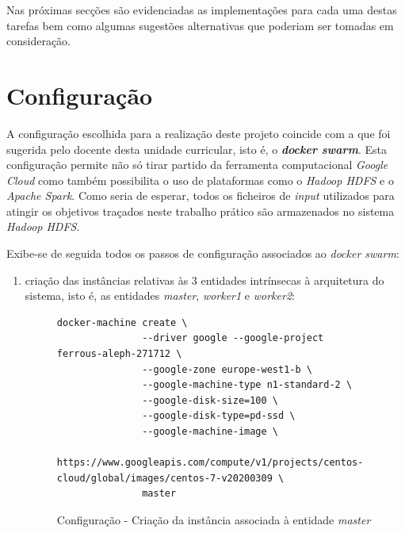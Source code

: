\documentclass[a4paper]{report}
\begin{document}
{    Nas próximas secções são evidenciadas as implementações para cada uma destas tarefas bem como algumas sugestões alternativas que poderiam ser tomadas em consideração.

    \section{Configuração} \label{sec:Configuration}
        A configuração escolhida para a realização deste projeto coincide com a que foi sugerida pelo docente desta unidade curricular, isto é, o \textbf{\textit{docker swarm}}.
        Esta configuração permite não só tirar partido da ferramenta computacional \textit{Google Cloud} como também possibilita o uso de plataformas como o \textit{Hadoop HDFS} e o \textit{Apache Spark}.
        Como seria de esperar, todos os ficheiros de \textit{input} utilizados para atingir os objetivos traçados neste trabalho prático são armazenados no sistema \textit{Hadoop HDFS}.
        
        Exibe-se de seguida todos os passos de configuração associados ao \textit{docker swarm}:
        \begin{enumerate}[label=\textbf{\arabic*.}]
            \item criação das instâncias relativas às 3 entidades intrínsecas à arquitetura do sistema, isto é, as entidades \textsl{master}, \textsl{worker1} e \textsl{worker2}:
            \begin{figure}[H]
                \centering
                \begin{verbatim}
docker-machine create \
               --driver google --google-project ferrous-aleph-271712 \
               --google-zone europe-west1-b \
               --google-machine-type n1-standard-2 \
               --google-disk-size=100 \
               --google-disk-type=pd-ssd \
               --google-machine-image \
       https://www.googleapis.com/compute/v1/projects/centos-cloud/global/images/centos-7-v20200309 \
               master
                \end{verbatim}
                \vspace{-5mm}
                \caption{Configuração - Criação da instância associada à entidade \textsl{master}}
                \label{fig:1}
            \end{figure}
            

\end{enumerate}}
\end{document}

